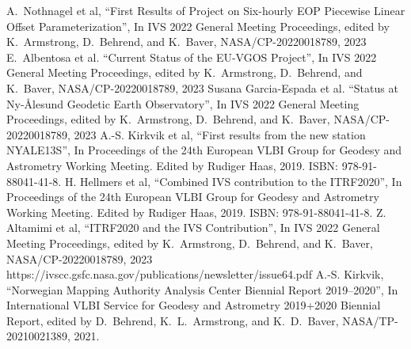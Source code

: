 \documentclass[twocolumn,twoside]{svmultivs_br} %
\begin{document}
\begin{thebibliography}{99}

A.\ Nothnagel et al, ``First Results of Project on Six-hourly EOP Piecewise Linear Offset Parameterization'',
In IVS 2022 General Meeting Proceedings, edited by K.\ Armstrong, D.\ Behrend, and K.\ Baver,
NASA/CP-20220018789, 2023
E.\ Albentosa et al. ``Current Status of the EU-VGOS Project'',
In IVS 2022 General Meeting Proceedings, edited by K.\ Armstrong, D.\ Behrend, and K.\ Baver,
NASA/CP-20220018789, 2023
Susana Garcia-Espada et al. ``Status at Ny-Ålesund Geodetic Earth Observatory'',
In IVS 2022 General Meeting Proceedings, edited by K.\ Armstrong, D.\ Behrend, and K.\ Baver,
NASA/CP-20220018789, 2023
A.-S. Kirkvik et al, ``First results from the new station NYALE13S'', In Proceedings of the 24th 
European VLBI Group for Geodesy and Astrometry Working Meeting. Edited by Rudiger Haas, 2019.
ISBN: 978-91-88041-41-8.
H. Hellmers et al, ``Combined IVS contribution to the ITRF2020'', In Proceedings of the 24th 
European VLBI Group for Geodesy and Astrometry Working Meeting. Edited by Rudiger Haas, 2019.
ISBN: 978-91-88041-41-8.
Z. Altamimi et al, ``ITRF2020 and the IVS Contribution'', 
In IVS 2022 General Meeting Proceedings, edited by K.\ Armstrong, D.\ Behrend, and K.\ Baver,
NASA/CP-20220018789, 2023
https://ivscc.gsfc.nasa.gov/publications/newsletter/issue64.pdf
A.-S. Kirkvik, ``Norwegian Mapping Authority Analysis Center Biennial Report 2019--2020'', 
In International VLBI Service for Geodesy and Astrometry 2019+2020 Biennial Report, edited by 
D.\ Behrend, K.\ L.\ Armstrong, and K.\ D.\ Baver,
 NASA/TP-20210021389, 2021. 

\end{thebibliography}
%
\end{document}
